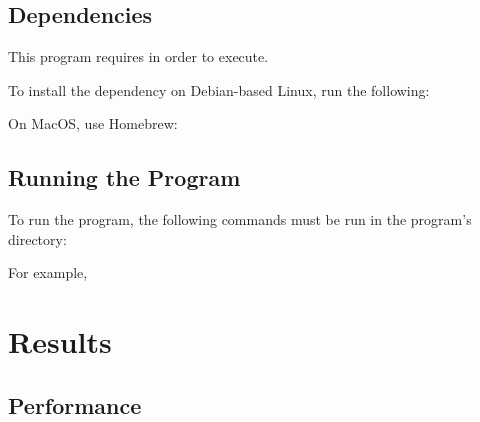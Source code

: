 \documentclass[12pt]{article}
\begin{document}
\subsection{Dependencies}

This program requires  in order to execute. 

    To install the dependency on Debian-based Linux, run the following:
    
    

    On MacOS, use Homebrew:
    
    

\subsection{Running the Program}

 To run the program, the following commands must be run in the program's directory:
 
 

 For example, 
 
 

\section{Results}

\subsection{Performance}
\end{document}
